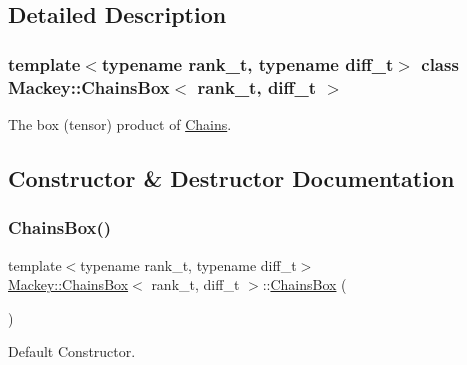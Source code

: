 \subsection{Detailed Description}
\subsubsection*{template$<$typename rank\+\_\+t, typename diff\+\_\+t$>$\newline
class Mackey\+::\+Chains\+Box$<$ rank\+\_\+t, diff\+\_\+t $>$}

The box (tensor) product of \hyperlink{classMackey_1_1Chains}{Chains}. 

\subsection{Constructor \& Destructor Documentation}
\mbox{\label{classMackey_1_1ChainsBox_aa5b4853612f378261b6d321da748f576}} 
\subsubsection{\texorpdfstring{Chains\+Box()}{ChainsBox()}\hspace{0.1cm}{\footnotesize\ttfamily [1/4]}}
{\footnotesize\ttfamily template$<$typename rank\+\_\+t, typename diff\+\_\+t$>$ \\
\hyperlink{classMackey_1_1ChainsBox}{Mackey\+::\+Chains\+Box}$<$ rank\+\_\+t, diff\+\_\+t $>$\+::\hyperlink{classMackey_1_1ChainsBox}{Chains\+Box} (\begin{DoxyParamCaption}{ }\end{DoxyParamCaption})\hspace{0.3cm}{\ttfamily [inline]}}



Default Constructor. 

\mbox{\label{classMackey_1_1ChainsBox_a30bb1f7fa7ca1e655c9d8b3501f98369}} 
